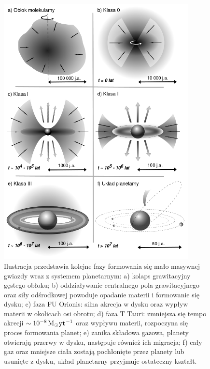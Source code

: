 
\begin{figure}[p]
\centering 
\includegraphics[width=0.9\textwidth]{figures/planetformation.png}
\caption{Ilustracja przedstawia kolejne fazy formowania się mało masywnej gwiazdy
   wraz z systemem planetarnym: a) kolaps grawitacyjny gęstego obłoku; b)
   oddziaływanie centralnego pola grawitacyjnego oraz siły odśrodkowej powoduje
   opadanie materii i formowanie się dysku; c) faza FU Orionis: silna akrecja w
   dysku oraz wypływ materii w okolicach osi obrotu; d) faza T Tauri: zmniejsza
   się tempo akrecji $\sim 10^{-8}\hbox{$\mathrm{\thinspace M_{\odot}}$}{\texttt{yt}}^{-1}$ oraz wypływu materii,
   rozpoczyna się proces formowania planet; e) zanika składowa gazowa, planety
otwierają przerwy w dysku, następuje również ich migracja; f) cały gaz oraz
mniejsze ciała zostają pochłonięte przez planety lub usunięte z dysku, układ
planetarny przyjmuje ostateczny kształt.}

\label{fig:planet}
\end{figure}

